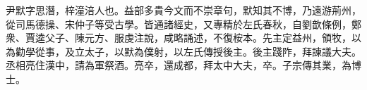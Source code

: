 \begin{pinyinscope}
 
 
 尹默字思潛，梓潼涪人也。益部多貴今文而不崇章句，默知其不博，乃遠游荊州，從司馬德操、宋仲子等受古學。皆通諸經史，又專精於左氏春秋，自劉歆條例，鄭衆、賈逵父子、陳元方、服虔注說，咸略誦述，不復桉本。先主定益州，領牧，以為勸學從事，及立太子，以默為僕射，以左氏傳授後主。後主踐阼，拜諫議大夫。丞相亮住漢中，請為軍祭酒。亮卒，還成都，拜太中大夫，卒。子宗傳其業，為博士。
 
 
 
 
\end{pinyinscope}